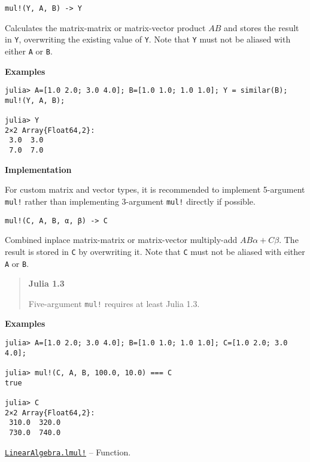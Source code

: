 \begin{adjustwidth}{2em}{0pt}


\begin{verbatim}
mul!(Y, A, B) -> Y
\end{verbatim}

Calculates the matrix-matrix or matrix-vector product \(AB\) and stores the result in \texttt{Y}, overwriting the existing value of \texttt{Y}. Note that \texttt{Y} must not be aliased with either \texttt{A} or \texttt{B}.

\textbf{Examples}


\begin{verbatim}
julia> A=[1.0 2.0; 3.0 4.0]; B=[1.0 1.0; 1.0 1.0]; Y = similar(B); mul!(Y, A, B);

julia> Y
2×2 Array{Float64,2}:
 3.0  3.0
 7.0  7.0
\end{verbatim}

\textbf{Implementation}

For custom matrix and vector types, it is recommended to implement 5-argument \texttt{mul!} rather than implementing 3-argument \texttt{mul!} directly if possible.




\begin{lstlisting}
mul!(C, A, B, α, β) -> C
\end{lstlisting}

Combined inplace matrix-matrix or matrix-vector multiply-add \(A B α + C β\). The result is stored in \texttt{C} by overwriting it.  Note that \texttt{C} must not be aliased with either \texttt{A} or \texttt{B}.

\begin{quote}
\textbf{Julia 1.3}

Five-argument \texttt{mul!} requires at least Julia 1.3.

\end{quote}
\textbf{Examples}


\begin{verbatim}
julia> A=[1.0 2.0; 3.0 4.0]; B=[1.0 1.0; 1.0 1.0]; C=[1.0 2.0; 3.0 4.0];

julia> mul!(C, A, B, 100.0, 10.0) === C
true

julia> C
2×2 Array{Float64,2}:
 310.0  320.0
 730.0  740.0
\end{verbatim}



\end{adjustwidth}
\hypertarget{12404459690324241452}{} 
\hyperlink{12404459690324241452}{\texttt{LinearAlgebra.lmul!}}  -- {Function.}

